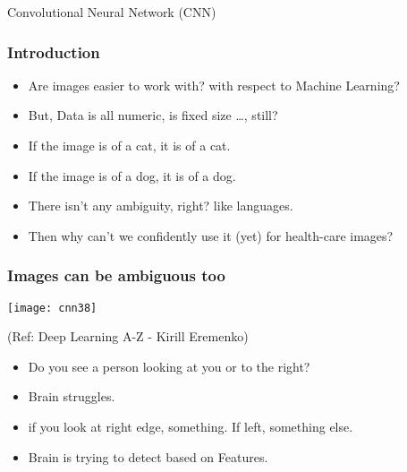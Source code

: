 \begin{frame}
  \begin{center}
    {\Large Convolutional Neural Network (CNN)}
  \end{center}
\end{frame}


\begin{frame}[fragile] \frametitle{Introduction}

\begin{itemize}
\item Are images easier to work with? with respect to Machine Learning?
\item But, Data is all numeric, is fixed size \ldots, still?
\item If the image is of a cat, it is of a cat.
\item If the image is of a dog, it is of a dog.
\item There isn't any ambiguity, right? like languages.
\item Then why can't we confidently use it (yet) for health-care images?
\end{itemize}


\end{frame}

\begin{frame}[fragile] \frametitle{Images can be ambiguous too}

\begin{center}
\texttt{[image: cnn38]}

\tiny{(Ref: Deep Learning A-Z - Kirill Eremenko)}
\end{center}

\begin{itemize}
\item  Do you see a person looking at you or to the right?
\item Brain struggles.
\item if you look at right edge, something. If left, something else.
\item Brain is trying to detect based on Features.
\end{itemize}


\end{frame}

